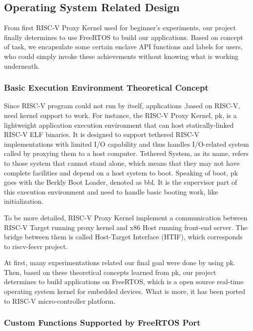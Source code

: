 \documentclass[conference]{IEEEtran}
\begin{document}

\subsection{Operating System Related Design}

From first RISC-V Proxy Kernel used for beginner's experiments, our project finally determines to use FreeRTOS to build our applications. Based on concept of task, we encapsulate some certain enclave API functions and labels for users, who could simply invoke these achievements without knowing what is working underneath. 

\subsubsection{Basic Execution Environment Theoretical Concept}

Since RISC-V program could not run by itself, applications ,based on RISC-V, need kernel support to work.  For instance, the RISC-V Proxy Kernel, pk, is a lightweight application execution environment that can host statically-linked RISC-V ELF binaries. It is designed to support tethered RISC-V implementations with limited I/O capability and thus handles I/O-related system called by proxying them to a host computer. Tethered System, as its name, refers to those system that cannot stand alone, which means that they may not have complete facilities and depend on a host system to boot. Speaking of boot, pk goes with the Berkly Boot Loader, denoted as bbl. It is the supervisor part of this execution environment and need to handle basic booting work, like initialization.

To be more detailed, RISC-V Proxy Kernel implement a communication between RISC-V Target running proxy kernel and x86 Host running front-end server. The bridge between them is called Host-Target Interface (HTIF), which corresponds to riscv-fesvr project.

At first, many experimentations related our final goal were done by using pk. Then, based on these theoretical concepts learned from pk, our project determines to build applications on FreeRTOS, which is a open source real-time operating system kernel for embedded devices. What is more, it has been ported to RISC-V micro-controller platform. 

\subsubsection{Custom Functions Supported by FreeRTOS Port}
\end{document}
